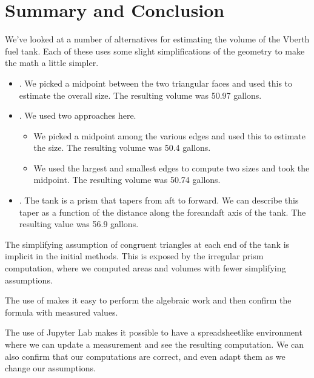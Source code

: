 \documentclass[letterpaper,10pt,english]{sphinxmanual}
\begin{document}
\chapter{Summary and Conclusion}
\label{\detokenize{conclusion:summary-and-conclusion}}\label{\detokenize{conclusion::doc}}
\sphinxAtStartPar
We’ve looked at a number of alternatives for estimating the volume of the V\sphinxhyphen{}berth fuel tank.
Each of these uses some slight simplifications of the geometry to make the math a little simpler.
\begin{itemize}
\item {} 
\sphinxAtStartPar
{}. We picked a mid\sphinxhyphen{}point between the two triangular faces and used this to estimate the overall size. The resulting volume was 50.97 gallons.

\item {} 
\sphinxAtStartPar
{}. We used two approaches here.
\begin{itemize}
\item {} 
\sphinxAtStartPar
We picked a mid\sphinxhyphen{}point among the various edges and used this to estimate the size. The resulting volume was 50.4 gallons.

\item {} 
\sphinxAtStartPar
We used the largest and smallest edges to compute two sizes and took the mid\sphinxhyphen{}point. The resulting volume was 50.74 gallons.

\end{itemize}

\item {} 
\sphinxAtStartPar
{}. The tank is a prism that tapers from aft to forward. We can describe this taper as a function of the distance along the fore\sphinxhyphen{}and\sphinxhyphen{}aft axis of the tank. The  resulting value was 56.9 gallons.

\end{itemize}

\sphinxAtStartPar
The simplifying assumption of congruent triangles at each end of the tank is implicit in the initial methods. This is exposed by the irregular prism computation, where we computed areas and volumes with fewer simplifying assumptions.

\sphinxAtStartPar
The use of  makes it easy to perform the algebraic work and then confirm the formula with measured values.

\sphinxAtStartPar
The use of Jupyter Lab makes it possible to have a spreadsheet\sphinxhyphen{}like environment where we can update a measurement and see the resulting computation. We can also confirm that our computations are correct, and even adapt them as we change our assumptions.







\renewcommand{\indexname}{Index}
\printindex
\end{document}
